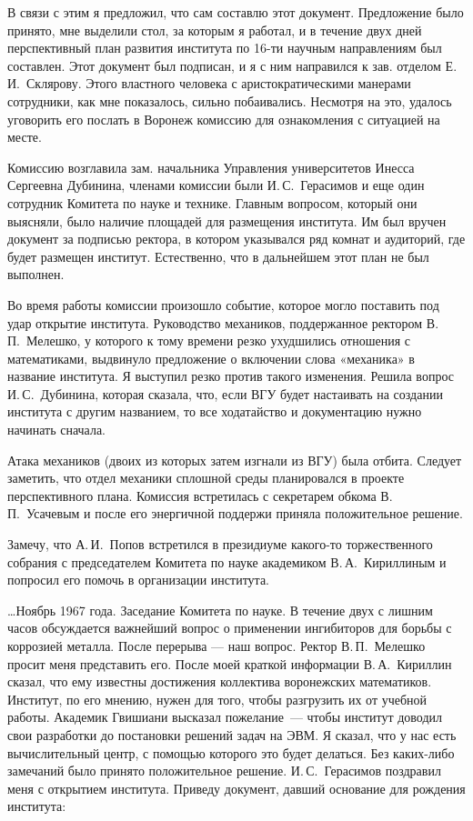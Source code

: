 В связи с этим я предложил, что сам составлю этот документ. Предложение было принято, мне выделили стол, за которым я работал, и в течение двух
дней перспективный план развития института по 16-ти научным направлениям был составлен. Этот документ был подписан, и я с ним направился к зав. отделом Е.\,И.~Склярову. Этого властного человека с аристократическими манерами сотрудники, как мне показалось, сильно побаивались. Несмотря на это, удалось уговорить его послать в Воронеж комиссию для ознакомления с ситуацией на месте.

Комиссию возглавила зам. начальника Управления университетов Инесса Сергеевна Дубинина, членами комиссии были И.\,С.~Герасимов и еще один сотрудник Комитета по науке и технике. Главным вопросом, который они выясняли, было наличие площадей для размещения института. Им был вручен документ за подписью ректора, в котором указывался ряд комнат и аудиторий, где будет размещен институт. Естественно, что в дальнейшем этот план не был выполнен.

Во время работы комиссии произошло событие, которое могло поставить под удар открытие института.
Руководство механиков, поддержанное ректором В.\,П.~Мелешко,
у которого к тому времени резко ухудшились отношения с математиками,
выдвинуло предложение о включении слова «механика» в название института.
Я выступил резко против такого изменения.
Решила вопрос И.\,С.~Дубинина, которая сказала, что, если ВГУ будет настаивать на создании института с другим названием,
то все ходатайство и документацию нужно начинать сначала.

Атака механиков (двоих из которых затем изгнали из ВГУ) была отбита.
Следует заметить, что отдел механики сплошной среды планировался в проекте перспективного плана.
Комиссия встретилась с секретарем обкома В.\,П.~Усачевым и после его энергичной поддержи приняла положительное решение.

Замечу, что А.\,И.~Попов встретился в президиуме какого-то торжественного собрания
с председателем Комитета по науке академиком В.\,А.~Кириллиным и попросил его помочь в организации института.

\ldots Ноябрь 1967 года. Заседание Комитета по науке.
В течение двух с лишним часов обсуждается важнейший вопрос о применении ингибиторов для борьбы с коррозией металла.
После перерыва --- наш вопрос. Ректор В.\,П.~Мелешко просит меня представить его.
После моей краткой информации В.\,А.~Кириллин сказал, что ему известны достижения коллектива воронежских математиков.
Институт, по его мнению, нужен для того, чтобы разгрузить их от учебной работы.
Академик Гвишиани высказал пожелание~--- чтобы институт доводил свои разработки до постановки решений задач на ЭВМ.
Я сказал, что у нас есть вычислительный центр, с помощью которого это будет делаться.
Без каких-либо замечаний было принято положительное решение.
И.\,С.~Герасимов поздравил меня с открытием института. Приведу документ, давший основание для рождения института:


